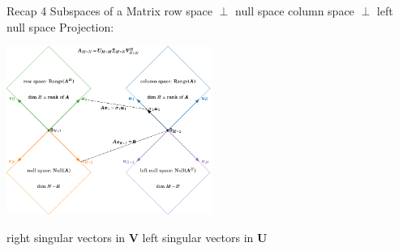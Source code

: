 \documentclass[mathserif, aspectratio=1610]{intbeamer}
\begin{document}
\begin{frame}[t]{Recap 4 Subspaces of a Matrix}
\hspace{-0.5cm}
\textcolor{C2}{row space} $\perp$ \textcolor{C1}{null space}
\hspace{0.5cm}
\textcolor{C0}{column space} $\perp$ \textcolor{C4}{left null space}
\hspace{0.5cm}
Projection:

\begin{flushleft}
\includegraphics[width=0.5\textwidth]{four_subspaces.pdf}
\end{flushleft}

\hspace{-0.5cm}
right singular vectors in $\bm{V}$
\hspace{0.5cm}
left singular vectors in $\bm{U}$

\end{frame}
\end{document}
